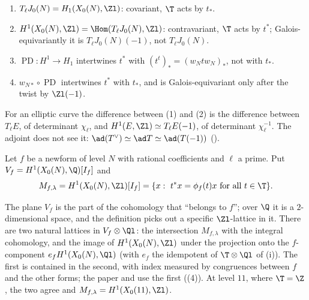 \begin{warning}\label{warn:moddeg:four-identifications}
\leavevmode
\begin{enumerate}[label=(\arabic*)]
\item $T_\ell J_0(N)=H_1(X_0(N),\Zl)$: covariant, $\T$ acts by $t_*$.
\item $H^1(X_0(N),\Zl)=\Hom(T_\ell J_0(N),\Zl)$: contravariant, $\T$ acts by $t^*$; Galois-equivariantly it is $T_\ell J_0(N)(-1)$, not $T_\ell J_0(N)$.
\item $\operatorname{PD}\colon H^1\to H_1$ intertwines $t^*$ with $(t^t)_*=(w_Ntw_N)_*$, not with $t_*$.
\item $w_{N*}\circ\operatorname{PD}$ intertwines $t^*$ with $t_*$, and is Galois-equivariant only after the twist by $\Zl(-1)$.
\end{enumerate}
For an elliptic curve the difference between (1) and (2) is the difference between $T_\ell E$, of determinant $\chi_\ell$, and $H^1(E,\Zl)\simeq T_\ell E(-1)$, of determinant
$\chi_\ell^{-1}$. The adjoint does not see it: $\ad(T^\vee)\simeq\ad T\simeq\ad(T(-1))$ ().
\end{warning}

\begin{definition}\label{def:moddeg:f-lattice}
Let $f$ be a newform of level $N$ with rational coefficients and $\ell$ a prime. Put $V_f=H^1(X_0(N),\Q)[I_f]$ and
\[
M_{f,\lambda}=H^1(X_0(N),\Zl)[I_f]=\{x:\ t^*x=\phi_f(t)x\ \text{for all }t\in\T\}.
\]
\end{definition}

The plane $V_f$ is the part of the cohomology that ``belongs to $f$''; over $\Q$ it is a $2$-dimensional space, and the definition picks out a specific $\Zl$-lattice in it. There are
two natural lattices in $V_f\otimes\Ql$: the intersection $M_{f,\lambda}$ with the integral cohomology, and the image of $H^1(X_0(N),\Zl)$ under the projection onto the $f$-component
$e_fH^1(X_0(N),\Ql)$ (with $e_f$ the idempotent of $\T\otimes\Ql$ of (i)). The first is contained in the second, with index measured by congruences
between $f$ and the other forms; the paper and \cite{DFG04} use the first ((4)). At level $11$, where $\T=\Z$, the two agree and
$M_{f,\lambda}=H^1(X_0(11),\Zl)$.

